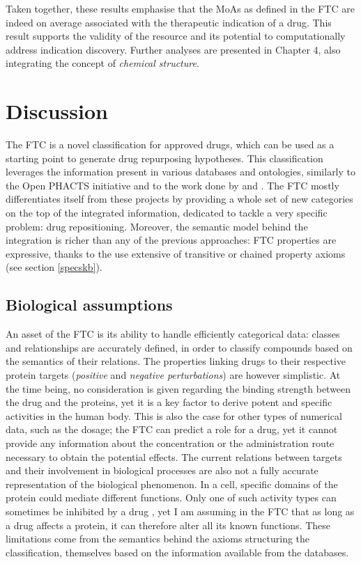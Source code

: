 Taken together, these results emphasise that the MoAs as defined in the FTC are indeed on average associated with the therapeutic indication of a drug. This result supports the validity of the resource and its potential to computationally address indication discovery. Further analyses are presented in Chapter 4, also integrating the concept of \emph{chemical structure}.

\section{Discussion}
The FTC is a novel classification for approved drugs, which can be used as a starting point to generate drug repurposing hypotheses. This classification leverages the information present in various databases and ontologies, similarly to the Open PHACTS initiative \citep{williams2012open} and to the work done by \cite{hoehndorf2012identifying} and \cite{jupp2012logical}. The FTC mostly differentiates itself from these projects by providing a whole set of new categories on the top of the integrated information, dedicated to tackle a very specific problem: drug repositioning. Moreover, the semantic model behind the integration is richer than any of the previous approaches: FTC properties are expressive, thanks to the use extensive of transitive or chained property axioms (see section \ref{specskb}).

\subsection{Biological assumptions}
An asset of the FTC is its ability to handle efficiently categorical data: classes and relationships are accurately defined, in order to classify compounds based on the semantics of their relations. The properties linking drugs to their respective protein targets (\emph{positive} and \emph{negative perturbations}) are however simplistic. At the time being, no consideration is given regarding the binding strength between the drug and the proteins, yet it is a key factor to derive potent and specific activities in the human body. This is also the case for other types of numerical data, such as the dosage; the FTC can predict a role for a drug, yet it cannot provide any information about the concentration or the administration route necessary to obtain the potential effects. The current relations between targets and their involvement in biological processes are also not a fully accurate representation of the biological phenomenon. In a cell, specific domains of the protein could mediate different functions. Only one of such activity types can sometimes be inhibited by a drug \citep{kruger2012mapping}, yet I am assuming in the FTC that as long as a drug affects a protein, it can therefore alter all its known functions. These limitations come from the semantics behind the axioms structuring the classification, themselves based on the information available from the databases.

